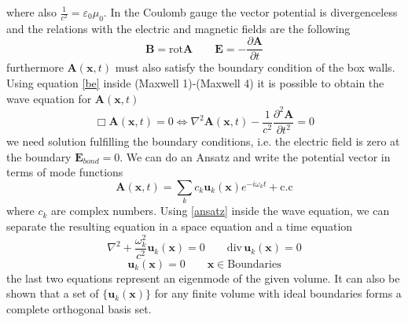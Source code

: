 \documentclass[12pt]{article}
\theoremstyle{plain}
\newcommand{\x}{\mathbf{x}}
\theoremstyle{definition}
\theoremstyle{remark}
\begin{document}
where also $\frac{1}{c^2} = \varepsilon_0\mu_0$. In the Coulomb gauge the vector potential is divergenceless and the relations with the electric and magnetic fields are the following
\begin{equation}\label{be}\mathbf{B} = \text{rot}\mathbf{A} \qquad \mathbf{E} = -\frac{\partial \mathbf{A}}{\partial t} \end{equation}
furthermore $\mathbf{A}(\x,t)$ must also satisfy the boundary condition of the box walls. Using equation \eqref{be} inside (Maxwell 1)-(Maxwell 4) it is possible to obtain the wave equation for $\mathbf{A}(\x,t)$
\begin{equation}\Box \mathbf{A}(\x,t) = 0 \iff \nabla^2 \mathbf{A}(\x,t)-\frac{1}{c^2}\frac{\partial^2\mathbf{A}}{\partial t^2} = 0\end{equation}
we need solution fulfilling the boundary conditions, i.e. the electric field is zero at the boundary $\mathbf{E}_{bond} = 0$. We can do an Ansatz and write the potential vector in terms of mode functions
\begin{equation}\label{ansatz}\mathbf{A}(\x,t) = \sum_k c_k \mathbf{u}_k(\x) e^{-i\omega_k t} + \text{c.c}\end{equation}
where $c_k$ are complex numbers. Using \eqref{ansatz} inside the wave equation, we can separate the resulting equation in a space equation and a time equation
\begin{equation}\nabla^2 + \frac{\omega_k^2}{c^2}\mathbf{u}_k(\x)  = 0 \qquad \text{div}\,\mathbf{u}_k(\x) = 0\end{equation}
\begin{equation}\mathbf{u}_k(\x) = 0 \qquad \x \in \text{Boundaries}\end{equation}
the last two equations represent an eigenmode of the given volume. It can also be shown that a set of $\{\mathbf{u}_k(\x) \}$ for any finite volume with ideal boundaries forms a complete orthogonal basis set.
\end{document}
